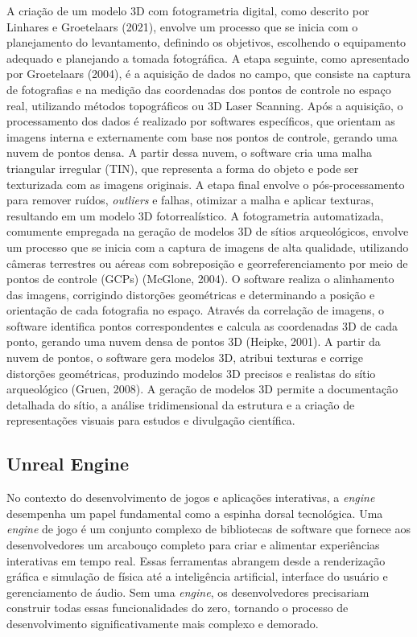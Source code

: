 A criação de um modelo 3D com fotogrametria digital, como descrito por Linhares e Groetelaars (2021), envolve um processo que se inicia com o planejamento do levantamento, definindo os objetivos, escolhendo o equipamento adequado e planejando a tomada fotográfica. A etapa seguinte, como apresentado por Groetelaars (2004), é a aquisição de dados no campo, que consiste na captura de fotografias e na medição das coordenadas dos pontos de controle no espaço real, utilizando métodos topográficos ou 3D Laser Scanning. Após a aquisição, o processamento dos dados é realizado por softwares específicos, que orientam as imagens interna e externamente com base nos pontos de controle, gerando uma nuvem de pontos densa. A partir dessa nuvem, o software cria uma malha triangular irregular (TIN), que representa a forma do objeto e pode ser texturizada com as imagens originais. A etapa final envolve o pós-processamento para remover ruídos, \textit{outliers} e falhas, otimizar a malha e aplicar texturas, resultando em um modelo 3D fotorrealístico.
A fotogrametria automatizada, comumente empregada na geração de modelos 3D de sítios arqueológicos, envolve um processo que se inicia com a captura de imagens de alta qualidade, utilizando câmeras terrestres ou aéreas com sobreposição e georreferenciamento por meio de pontos de controle (GCPs) (McGlone, 2004). O software realiza o alinhamento das imagens, corrigindo distorções geométricas e determinando a posição e orientação de cada fotografia no espaço. Através da correlação de imagens, o software identifica pontos correspondentes e calcula as coordenadas 3D de cada ponto, gerando uma nuvem densa de pontos 3D (Heipke, 2001). A partir da nuvem de pontos, o software gera modelos 3D, atribui texturas e corrige distorções geométricas, produzindo modelos 3D precisos e realistas do sítio arqueológico (Gruen, 2008). A geração de modelos 3D permite a documentação detalhada do sítio, a análise tridimensional da estrutura e a criação de representações visuais para estudos e divulgação científica.


\subsection{Unreal Engine}No contexto do desenvolvimento de jogos e aplicações interativas, a \textit{engine} desempenha um papel fundamental como a espinha dorsal tecnológica. Uma \textit{engine} de jogo é um conjunto complexo de bibliotecas de software que fornece aos desenvolvedores um arcabouço completo para criar e alimentar experiências interativas em tempo real. Essas ferramentas abrangem desde a renderização gráfica e simulação de física até a inteligência artificial, interface do usuário e gerenciamento de áudio. Sem uma \textit{engine}, os desenvolvedores precisariam construir todas essas funcionalidades do zero, tornando o processo de desenvolvimento significativamente mais complexo e demorado. 

